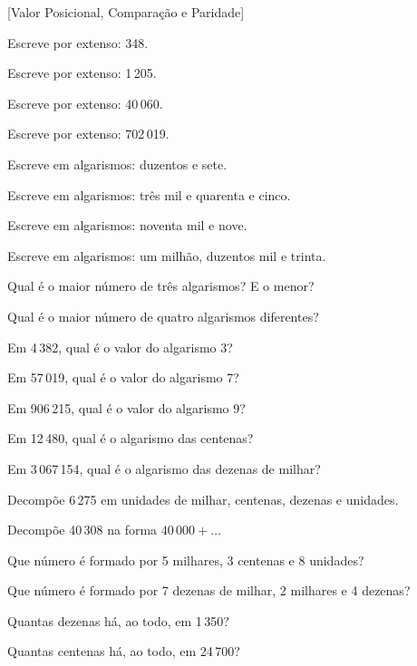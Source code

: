 \documentclass[12pt]{article}
\begin{document}
[Valor Posicional, Comparação e Paridade]


\begin{exercicios}
  \item Escreve por extenso: 348.
  \item Escreve por extenso: 1\,205.
  \item Escreve por extenso: 40\,060.
  \item Escreve por extenso: 702\,019.
  \item Escreve em algarismos: duzentos e sete.
  \item Escreve em algarismos: três mil e quarenta e cinco.
  \item Escreve em algarismos: noventa mil e nove.
  \item Escreve em algarismos: um milhão, duzentos mil e trinta.
  \item Qual é o maior número de três algarismos? E o menor?
  \item Qual é o maior número de quatro algarismos diferentes?
\end{exercicios}

\begin{exercicios}
  \item Em 4\,382, qual é o valor do algarismo 3?
  \item Em 57\,019, qual é o valor do algarismo 7?
  \item Em 906\,215, qual é o valor do algarismo 9?
  \item Em 12\,480, qual é o algarismo das centenas?
  \item Em 3\,067\,154, qual é o algarismo das dezenas de milhar?
  \item Decompõe 6\,275 em unidades de milhar, centenas, dezenas e unidades.
  \item Decompõe 40\,308 na forma $40\,000 + \ldots$
  \item Que número é formado por 5 milhares, 3 centenas e 8 unidades?
  \item Que número é formado por 7 dezenas de milhar, 2 milhares e 4 dezenas?
  \item Quantas dezenas há, ao todo, em 1\,350?
  \item Quantas centenas há, ao todo, em 24\,700?
\end{exercicios}
\end{document}
